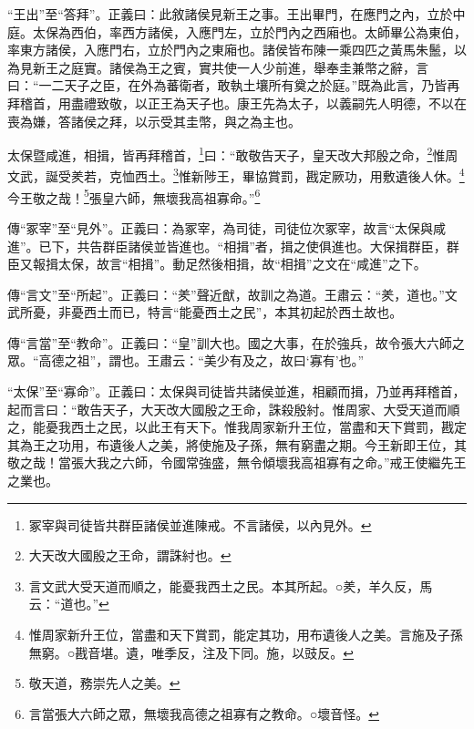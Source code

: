 {\noindent\shu{}\fzkt “王出”至“答拜”。正義曰：此敘諸侯見新王之事。王出畢門，在應門之內，立於中庭。太保為西伯，率西方諸侯，入應門左，立於門內之西廂也。太師畢公為東伯，率東方諸侯，入應門右，立於門內之東廂也。諸侯皆布陳一乘四匹之黃馬朱鬛，以為見新王之庭實。諸侯為王之賓，實共使一人少前進，舉奉圭兼幣之辭，言曰：“一二天子之臣，在外為蕃衛者，敢執土壤所有奠之於庭。”既為此言，乃皆再拜稽首，用盡禮致敬，以正王為天子也。康王先為太子，以義嗣先人明德，不以在喪為嫌，答諸侯之拜，以示受其圭幣，與之為主也。 \par}

太保暨咸進，相揖，皆再拜稽首，\footnote{冢宰與司徒皆共群臣諸侯並進陳戒。不言諸侯，以內見外。}曰：“敢敬告天子，皇天改大邦殷之命，\footnote{大天改大國殷之王命，謂誅紂也。}惟周文武，誕受羑若，克恤西土。\footnote{言文武大受天道而順之，能憂我西土之民。本其所起。○羑，羊久反，馬云：“道也。”}惟新陟王，畢協賞罰，戡定厥功，用敷遺後人休。\footnote{惟周家新升王位，當盡和天下賞罰，能定其功，用布遺後人之美。言施及子孫無窮。○戡音堪。遺，唯季反，注及下同。施，以豉反。}今王敬之哉！\footnote{敬天道，務崇先人之美。}張皇六師，無壞我高祖寡命。”\footnote{言當張大六師之眾，無壞我高德之祖寡有之教命。○壞音怪。}


{\noindent\zhuan{}\fzbyks 傳“冢宰”至“見外”。正義曰：為冢宰，為司徒，司徒位次冢宰，故言“太保與咸進”。已下，共告群臣諸侯並皆進也。“相揖”者，揖之使俱進也。大保揖群臣，群臣又報揖太保，故言“相揖”。動足然後相揖，故“相揖”之文在“咸進”之下。 \par}

{\noindent\zhuan{}\fzbyks 傳“言文”至“所起”。正義曰：“羑”聲近猷，故訓之為道。王肅云：“羑，道也。”文武所憂，非憂西土而已，特言“能憂西土之民”，本其初起於西土故也。 \par}

{\noindent\zhuan{}\fzbyks 傳“言當”至“教命”。正義曰：“皇”訓大也。國之大事，在於強兵，故令張大六師之眾。“高德之祖”，謂也。王肅云：“美少有及之，故曰‘寡有’也。” \par}

{\noindent\shu{}\fzkt “太保”至“寡命”。正義曰：太保與司徒皆共諸侯並進，相顧而揖，乃並再拜稽首，起而言曰：“敢告天子，大天改大國殷之王命，誅殺殷紂。惟周家、大受天道而順之，能憂我西土之民，以此王有天下。惟我周家新升王位，當盡和天下賞罰，戡定其為王之功用，布遺後人之美，將使施及子孫，無有窮盡之期。今王新即王位，其敬之哉！當張大我之六師，令國常強盛，無令傾壞我高祖寡有之命。”戒王使繼先王之業也。 \par}

